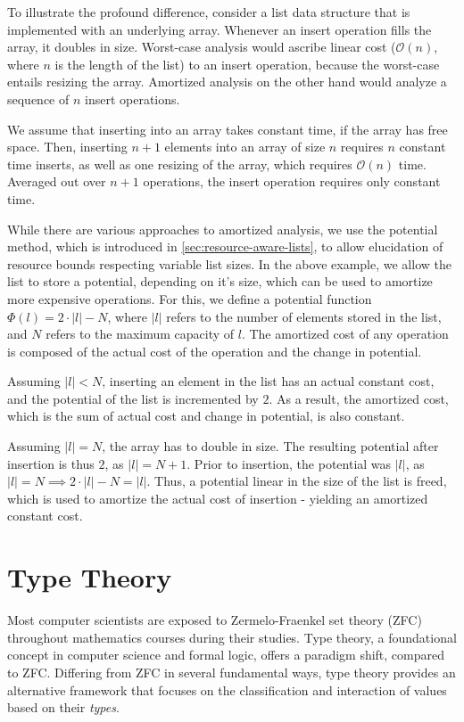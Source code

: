 To illustrate the profound difference, consider a list data structure that is implemented with an underlying array. Whenever an insert operation fills the array, it doubles in size. Worst-case analysis would ascribe linear cost (\(\mathcal{O}(n)\), where \(n\) is the length of the list) to an insert operation, because the worst-case entails resizing the array. Amortized analysis on the other hand would analyze a sequence of \(n\) insert operations.

We assume that inserting into an array takes constant time, if the array has free space. Then, inserting \(n + 1\) elements into an array of size \(n\) requires \(n\) constant time inserts, as well as one resizing of the array, which requires \(\mathcal{O}(n)\) time. Averaged out over \(n + 1\) operations, the insert operation requires only constant time. 

While there are various approaches to amortized analysis, we use the potential method, which is introduced in \cref{sec:resource-aware-lists}, to allow elucidation of resource bounds respecting variable list sizes. In the above example, we allow the list to store a potential, depending on it's size, which can be used to amortize more expensive operations. For this, we define a potential function \(\Phi(l) = 2\cdot |l| - N\), where \(|l|\) refers to the number of elements stored in the list, and \(N\) refers to the maximum capacity of \(l\). The amortized cost of any operation is composed of the actual cost of the operation and the change in potential.

Assuming \(|l| < N\), inserting an element in the list has an actual constant cost, and the potential of the list is incremented by \(2\). As a result, the amortized cost, which is the sum of actual cost and change in potential, is also constant. 

Assuming \(|l| = N\), the array has to double in size. The resulting potential after insertion is thus \(2\), as \(|l| = N + 1\). Prior to insertion, the potential was \(|l|\), as \(|l| = N \implies 2 \cdot |l| - N = |l|\). Thus, a potential linear in the size of the list is freed, which is used to amortize the actual cost of insertion - yielding an amortized constant cost.

\section{Type Theory}

Most computer scientists are exposed to Zermelo-Fraenkel set theory (ZFC) throughout mathematics courses during their studies. Type theory, a foundational concept in computer science and formal logic, offers a paradigm shift, compared to ZFC. Differing from ZFC in several fundamental ways, type theory provides an alternative framework that focuses on the classification and interaction of values based on their \emph{types}.

